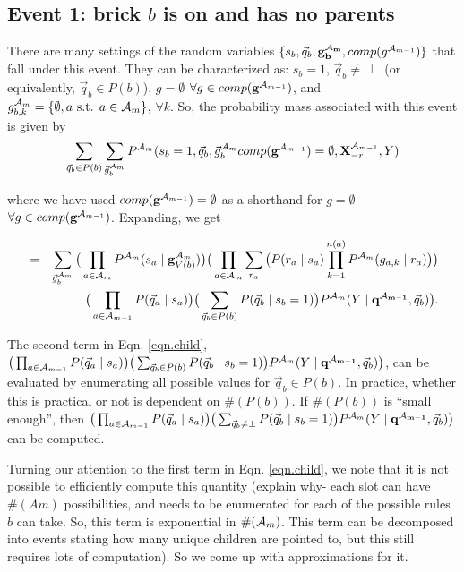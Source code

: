 \documentclass[11pt]{article}
\newcommand{\A}{{\cal A}}
\newcommand{\X}{\mathbf{X}}
\newcommand{\XrmPrev}{\X^{\A_{m-1}}_{-r}}
\newcommand{\Am}{\A_{m}}
\newcommand{\gcompPrev}{comp(\mathbf{g}^{\A_{m-1}})}
\newcommand{\qb}{\vec{q}_b}
\newcommand{\qa}{\vec{q}_a}
\begin{document}
\subsection*{Event 1: brick $b$ is on and has no parents}

There are many settings of the random variables $\{s_b, \qb, \mathbf{g^{\Am}_b}, comp(g^{\A_{m-1}})\}$ that fall under this event. They can be characterized as: $s_b=1$, $\qb \neq \perp$ (or equivalently, $\qb \in P(b)$), $g = \emptyset$ $\forall g \in \gcompPrev$, and $g^{\Am}_{b,k} = \{\emptyset, a \text{ s.t. } a \in {\Am}\}$, $\forall k$. So, the probability mass associated with this event is given by
\begin{eqnarray}
\sum_{\vec{q}_b \in P(b)} \sum_{\vec{g}^{\Am}_{b}} P^{\Am}(s_b=1, \vec{q}_b, \vec{g}^{\Am}_{b} \gcompPrev = \emptyset, \XrmPrev, Y)
\end{eqnarray}

where we have used $\gcompPrev = \emptyset$ as a shorthand for $g = \emptyset$ $\forall g \in \gcompPrev$. Expanding, we get

\begin{eqnarray}
&=& \sum_{\vec{g}^{\Am}_{b}} \big( \prod_{a \in {\Am}} P^{\Am}(s_a \mid \mathbf{g}^{\Am}_{V({b})}) \big ) \big( \prod_{a \in {\A_{m}}} \sum_{r_a} \big(P(r_a \mid s_a) \prod_{k=1}^{n(a)} P^{\Am}(g_{a,k} \mid r_a) \big) \big) \label{eqn.child} \\
%
& & \big( \prod_{a \in {\A_{m-1}}} P(\qa \mid s_a)\big) \big( \sum_{\vec{q}_b \in P(b)} P(\qb \mid s_b = 1)\big) P^{\Am}(Y \mid \mathbf{q^{\A_{m-1}}}, \vec{q}_b) \big). \nonumber
\end{eqnarray}

The second term in Eqn. \ref{eqn.child}, $\big( \prod_{a \in {\A_{m-1}}} P(\qa \mid s_a)\big) \big( \sum_{\vec{q}_b \in P(b)} P(\qb \mid s_b = 1)\big) P^{\Am}(Y \mid \mathbf{q^{\A_{m-1}}}, \vec{q}_b) \big)$, can be evaluated by enumerating all possible values for $\vec{q}_b \in P(b)$. In practice, whether this is practical or not is dependent on $\#(P(b))$. If $\#(P(b))$ is ``small enough'', then $\big( \prod_{a \in {\A_{m-1}}} P(\qa \mid s_a)\big) \big( \sum_{\vec{q}_b \neq \perp} P(\qb \mid s_b = 1)\big) P^{\Am}(Y \mid \mathbf{q^{\A_{m-1}}}, \vec{q}_b) \big)$ can be computed. 

Turning our attention to the first term in Eqn. \ref{eqn.child}, we note that it is not possible to efficiently compute this quantity (explain why- each slot can have $\#(Am)$ possibilities, and needs to be enumerated for each of the possible rules $b$ can take. So, this term is exponential in $\#(\Am)$. This term can be decomposed into events stating how many unique children are pointed to, but this still requires lots of computation). So we come up with approximations for it.
\end{document}
